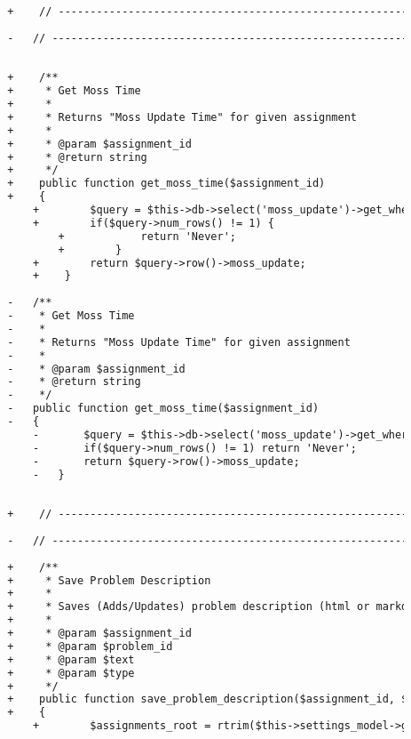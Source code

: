 \begin{lstlisting}[language=diff, caption=Perubahan pada kode Assignment\_model.php]
		
		+    // ------------------------------------------------------------------------
		
		-	// ------------------------------------------------------------------------
		
		
		+    /**
		+     * Get Moss Time
		+     *
		+     * Returns "Moss Update Time" for given assignment
		+     *
		+     * @param $assignment_id
		+     * @return string
		+     */
		+    public function get_moss_time($assignment_id)
		+    {
			+        $query = $this->db->select('moss_update')->get_where('assignments', array('id' => $assignment_id));
			+        if($query->num_rows() != 1) {
				+            return 'Never';
				+        }
			+        return $query->row()->moss_update;
			+    }
		
		-	/**
		-	 * Get Moss Time
		-	 *
		-	 * Returns "Moss Update Time" for given assignment
		-	 *
		-	 * @param $assignment_id
		-	 * @return string
		-	 */
		-	public function get_moss_time($assignment_id)
		-	{
			-		$query = $this->db->select('moss_update')->get_where('assignments', array('id'=>$assignment_id));
			-		if($query->num_rows() != 1) return 'Never';
			-		return $query->row()->moss_update;
			-	}
		
		
		+    // ------------------------------------------------------------------------
		
		-	// ------------------------------------------------------------------------
		
		+    /**
		+     * Save Problem Description
		+     *
		+     * Saves (Adds/Updates) problem description (html or markdown)
		+     *
		+     * @param $assignment_id
		+     * @param $problem_id
		+     * @param $text
		+     * @param $type
		+     */
		+    public function save_problem_description($assignment_id, $problem_id, $text, $type)
		+    {
			+        $assignments_root = rtrim($this->settings_model->get_setting('assignments_root'), '/');
			

\end{lstlisting}
